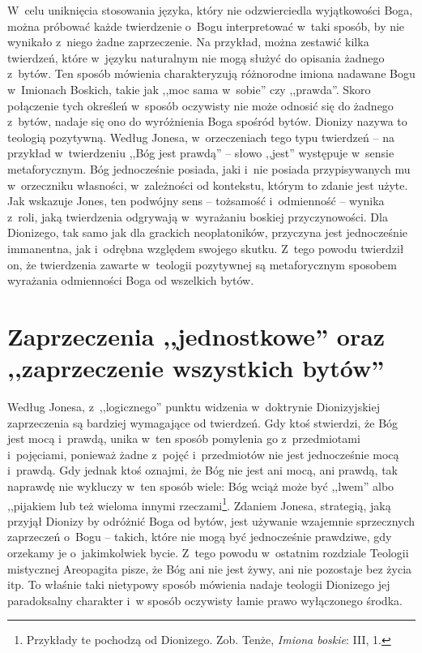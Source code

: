 W~celu uniknięcia stosowania języka, który nie odzwierciedla wyjątkowości Boga, można próbować każde twierdzenie o~Bogu interpretować w~taki sposób, by nie wynikało z~niego żadne zaprzeczenie. Na przykład, można zestawić kilka twierdzeń, które w~języku naturalnym nie mogą służyć do opisania żadnego z~bytów. Ten sposób mówienia charakteryzują różnorodne imiona nadawane Bogu w~Imionach Boskich, takie jak ,,moc sama w~sobie'' czy ,,prawda''. Skoro połączenie tych określeń w~sposób oczywisty nie może odnosić się do żadnego z~bytów, nadaje się ono do wyróżnienia Boga spośród bytów. Dionizy nazywa to teologią pozytywną. Według Jonesa, w~orzeczeniach tego typu twierdzeń -- na przykład w~twierdzeniu ,,Bóg jest prawdą'' -- słowo ,,jest'' występuje w~sensie metaforycznym. Bóg jednocześnie posiada, jaki i~nie posiada przypisywanych mu w~orzeczniku własności, w~zależności od kontekstu, którym to zdanie jest użyte. Jak wskazuje Jones, ten podwójny sens -- tożsamość i~odmienność -- wynika z~roli, jaką twierdzenia odgrywają w~wyrażaniu boskiej przyczynowości. Dla Dionizego, tak samo jak dla grackich neoplatoników, przyczyna jest jednocześnie immanentna, jak i~odrębna względem swojego skutku. Z~tego powodu twierdził on, że twierdzenia zawarte w~teologii pozytywnej są metaforycznym sposobem wyrażania odmienności Boga od wszelkich bytów.


\section{Zaprzeczenia ,,jednostkowe'' oraz ,,zaprzeczenie wszystkich bytów''}

Według Jonesa, z~,,logicznego'' punktu widzenia w~doktrynie Dionizyjskiej zaprzeczenia są bardziej wymagające od twierdzeń. Gdy ktoś stwierdzi, że Bóg jest mocą i~prawdą, unika w~ten sposób pomylenia go z~przedmiotami i~pojęciami, ponieważ żadne z~pojęć i~przedmiotów nie jest jednocześnie mocą i~prawdą. Gdy jednak ktoś oznajmi, że Bóg nie jest ani mocą, ani prawdą, tak naprawdę nie wykluczy w~ten sposób wiele: Bóg wciąż może być ,,lwem'' albo ,,pijakiem lub też wieloma innymi rzeczami\footnote{Przykłady te pochodzą od Dionizego. Zob. Tenże, \textit{Imiona boskie}: III, 1.}. Zdaniem Jonesa, strategią, jaką przyjął Dionizy by odróżnić Boga od bytów, jest używanie wzajemnie sprzecznych zaprzeczeń o~Bogu -- takich, które nie mogą być jednocześnie prawdziwe, gdy orzekamy je o~jakimkolwiek bycie. Z~tego powodu w~ostatnim rozdziale Teologii mistycznej Areopagita pisze, że Bóg ani nie jest żywy, ani nie pozostaje bez życia itp. To właśnie taki nietypowy sposób mówienia nadaje teologii Dionizego jej paradoksalny charakter i~w sposób oczywisty łamie prawo wyłączonego środka.

